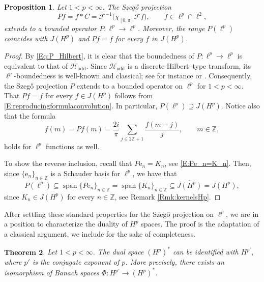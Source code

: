 \documentclass[12pt,a4paper,reqno]{amsart}
\newtheorem{thm}{Theorem}[section]
\newtheorem{prop}[thm]{Proposition}
\theoremstyle{definition}
\theoremstyle{definition}\newtheorem{defn}[thm]{Definition}
\begin{document}
    \begin{prop}\label{P:szegoproj}
        Let $1<p<\infty$. The Szeg\H o projection 
        \begin{equation*} 
        Pf=f\ast C=\mathcal{F}^{-1}\big(\chi_{[0,\pi]}\mathcal{F}f\big), \qquad f\in\ell^p\cap\ell^2,
    \end{equation*}
    extends to a bounded operator $P\colon\ell^p\to\ell^p$. Moreover, the range $P(\ell^p)$ coincides with $J(H^p)$ and $Pf=f$ for every $f$ in $J(H^p)$.  
    \end{prop}
    \begin{proof}
    By \eqref{Eq:P_Hilbert}, it is clear that the boundedness of $P\colon\ell^p\to\ell^p$ is equivalent to that of $\mathcal{H}_{\operatorname{odd}}$. Since $\mathcal H_{\operatorname{odd}}$ is a discrete Hilbert--type transform, its $\ell^p$-boundedness is well-known and classical; see for instance \cite{HMW} or \cite{BK}. Consequently, the Szeg\H o projection $P$ extends to a bounded operator on $\ell^p$ for $1<p<\infty$. That $Pf=f$ for every $f\in J(H^p)$ follows from \eqref{E:reproducingformulaconvolution}. In particular, $P(\ell^p)\supseteq J(H^p)$. Notice also that the formula 
    \begin{equation}\label{eq:hilbert_lp}
    f(m)=Pf(m)=\frac{2i}{\pi}\sum_{j\in2\mathbb Z+1}\frac{f(m-j)}{j}, \qquad m\in\mathbb{Z},
    \end{equation}
    holds for $\ell^p$ functions as well. 
    
    To show the reverse inclusion, recall that $P\text{e}_n=K_n$, see \eqref{E:Pe_n=K_n}. Then, since $\{\text{e}_n\}_{n\in\mathbb{Z}}$ is a Schauder basis for $\ell^p$, we have that
    \[
    P(\ell^p)\subseteq \overline{\operatorname{span}\{P\text{e}_n\}_{n\in\mathbb{Z}}}=\overline{\operatorname{span}\{K_n\}_{n\in\mathbb{Z}}}\subseteq \overline{J(H^p)}=J(H^p),
    \]
    since $K_n\in J(H^p)$ for every $n\in\mathbb{Z}$, see Remark \ref{Rmk:kernelsHp}.
    \end{proof}
    
    After settling these standard properties for the Szeg\H o projection on $\ell^p$, we are in a position to characterize the duality of $H^p$ spaces. The proof is the adaptation of a classical argument, we include for the sake of completeness.
    
    \begin{thm}
        Let $1<p<\infty$. The dual space $(H^p)^*$ can be identified with $H^{p'},$ where $p'$ is the conjugate exponent of $p$. More precisely, there exists an isomorphism of Banach spaces $\Phi\colon H^{p'}\to(H^p)^*$.
    \end{thm}
    
\end{document}
